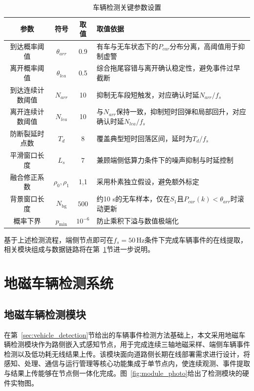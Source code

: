 \documentclass{xdupgthesis}
\makeatletter
\newcommand{\Fs}{\ensuremath{50\,\mathrm{Hz}}}
\newcommand{\SmoothLen}{\ensuremath{7}}        %
\newcommand{\BgWinPts}{\ensuremath{500}}       %
\newcommand{\ProbFloor}{\ensuremath{10^{-6}}}  %
\providecommand{\FloatBarrier}{}
\makeatother
\begin{document}
\begin{table}[!htbp]
    \centering
    \caption{车辆检测关键参数设置}
    \label{tab:det_param}
    \begin{tabular}{c c c C{6.4cm}}
        \toprule
        参数 & 符号 & 取值 & 取值依据 \\
        \midrule
        到达概率阈值 & $\theta_{arr}$ & 0.9 & 有车与无车状态下的$P_{car}$分布分离，高阈值用于抑制虚警 \\
        离开概率阈值 & $\theta_{lea}$ & 0.5 & 综合拖尾容错与离开确认稳定性，避免事件过早截断 \\
        到达连续计数阈值 & $N_{arr}$ & 10 & 抑制无车段短触发，对应确认时延$N_{arr}/f_s$ \\
        离开连续计数阈值 & $N_{lea}$ & 10 & 与$N_{arr}$保持一致，抑制短时回弹和局部回升，对应确认时延$N_{lea}/f_s$ \\
        防断裂延时点数 & $T_d$ & 8 & 覆盖典型短时回落区间，延时为$T_d/f_s$ \\
        \addlinespace[2pt]
        平滑窗口长度 & $L_s$ & \SmoothLen & 兼顾端侧低算力条件下的噪声抑制与时延控制 \\
        融合修正系数 & $\rho_0,\rho_1$ & 1,1 & 采用朴素独立假设，避免额外标定 \\
        背景窗口长度 & $N_{\mathrm{bg}}$ & \BgWinPts & 约10 s的无车样本，仅在$S_1$且$P_{car}(k)<\theta_{arr}$时滚动更新 \\
        概率下界 & $p_{\min}$ & \ProbFloor & 防止乘积下溢与数值极端化 \\
        \bottomrule
    \end{tabular}
\end{table}

基于上述检测流程，端侧节点即可在$f_s=\Fs$条件下完成车辆事件的在线提取，相关模块组成与数据链路将在第~\ref{sec:ch2_system}节进一步说明。

\FloatBarrier

\section{地磁车辆检测系统}
\label{sec:ch2_system}

\subsection{地磁车辆检测模块}
\label{sec:ch2_module}

在第~\ref{sec:vehicle_detection}节给出的车辆事件检测方法基础上，本文采用地磁车辆检测模块作为路侧嵌入式感知节点，用于完成连续三轴地磁采样、端侧车辆事件检测以及低功耗无线结果上传。该模块面向道路侧长期在线部署需求进行设计，将感知、处理、通信与运行管理等核心功能集成于单节点内，使连续观测、事件提取与结果上传能够在节点侧一体化完成。图~\ref{fig:module_photo}给出了检测模块的硬件实物图。
\end{document}
